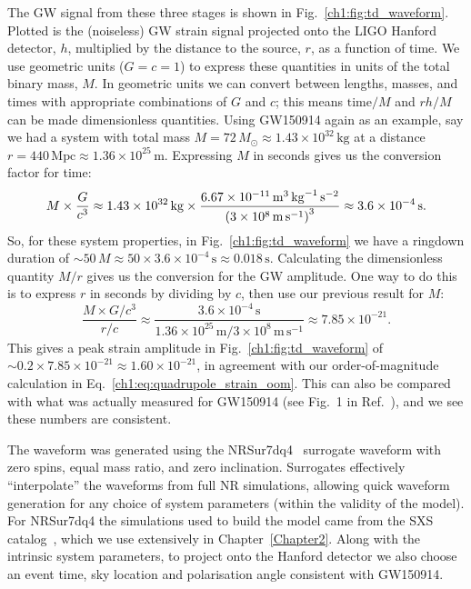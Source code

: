 The GW signal from these three stages is shown in Fig.~\ref{ch1:fig:td_waveform}.
Plotted is the (noiseless) GW strain signal projected onto the LIGO Hanford detector, $h$, multiplied by the distance to the source, $r$, as a function of time. 
We use geometric units ($G = c = 1$) to express these quantities in units of the total binary mass, $M$. 
In geometric units we can convert between lengths, masses, and times with appropriate combinations of $G$ and $c$; this means $\mathrm{time}/M$ and $rh/M$ can be made dimensionless quantities. 
Using GW150914 again as an example, say we had a system with total mass $M = 72\,M_\odot \approx 1.43 \times 10^{32}\,\mathrm{kg}$ at a distance $r = 440\,\mathrm{Mpc} \approx 1.36 \times 10^{25}\,\mathrm{m}$. 
Expressing $M$ in seconds gives us the conversion factor for time:
\begin{equation}
    M \times \frac{G}{c^3} \approx 1.43 \times 10^{32}\, \mathrm{kg} \times \frac{6.67 \times 10^{-11}\, \mathrm{m}^3\, \mathrm{kg}^{-1}\, \mathrm{s}^{-2}}{\qty(3 \times 10^8\, \mathrm{m}\, \mathrm{s}^{-1})^3} \approx 3.6 \times 10^{-4}\, \mathrm{s}.
\end{equation}
So, for these system properties, in Fig.~\ref{ch1:fig:td_waveform} we have a ringdown duration of $\sim 50\,M \approx 50 \times 3.6 \times 10^{-4}\,\mathrm{s} \approx 0.018\,\mathrm{s}$. 
Calculating the dimensionless quantity $M/r$ gives us the conversion for the GW amplitude. 
One way to do this is to express $r$ in seconds by dividing by $c$, then use our previous result for $M$:
\begin{equation}
    \frac{M \times G/c^3}{r/c} \approx \frac{3.6 \times 10^{-4}\,\mathrm{s}}{1.36 \times 10^{25}\, \mathrm{m}/3 \times 10^8\, \mathrm{m}\, \mathrm{s}^{-1}} \approx 7.85 \times 10^{-21}.
\end{equation}
This gives a peak strain amplitude in Fig.~\ref{ch1:fig:td_waveform} of $\sim 0.2 \times 7.85 \times 10^{-21} \approx 1.60 \times 10^{-21}$, in agreement with our order-of-magnitude calculation in Eq.~\ref{ch1:eq:quadrupole_strain_oom}. 
This can also be compared with what was actually measured for GW150914 (see Fig.~1 in Ref.~\cite{LIGOScientific:2016aoc}), and we see these numbers are consistent.

The waveform was generated using the NRSur7dq4~\cite{Varma:2019csw} surrogate waveform with zero spins, equal mass ratio, and zero inclination. 
Surrogates effectively ``interpolate'' the waveforms from full NR simulations, allowing quick waveform generation for any choice of system parameters (within the validity of the model). 
For NRSur7dq4 the simulations used to build the model came from the SXS catalog~\cite{Boyle:2019kee}, which we use extensively in Chapter~\ref{Chapter2}. 
Along with the intrinsic system parameters, to project onto the Hanford detector we also choose an event time, sky location and polarisation angle consistent with GW150914.


